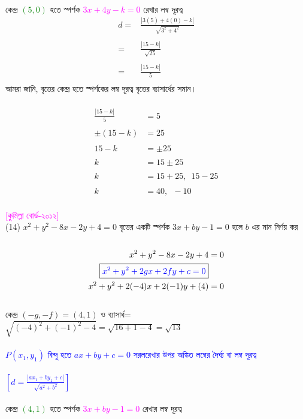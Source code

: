 \documentclass{article}
\begin{document}
	\\
	কেন্দ্র \textcolor{green}{$(5,0)$} হতে স্পর্শক \textcolor{magenta}{$3x+4y-k=0$}  রেখার লম্ব দূরত্ব \\
	\begin{align*}
		d=	&\frac{|3(5)+4(0)-k|}{\sqrt{3^2+4^2}}\\
		\\
		=	&	\frac{|15-k|}{\sqrt{25}}\\
		\\
		=	&	\frac{|15-k|}{5}\\
	\end{align*}
	আমরা জানি, বৃত্তের কেন্দ্র হতে স্পর্শকের লম্ব দূরত্ব বৃত্তের ব্যাসার্ধের সমান। \\
	\\ 
	\begin{align*}
		\frac{|15-k|}{5}&=5\\
		\\
		\pm (15-k)&=25\\
		\\
		15-k&=\pm 25\\
		\\
		k&=15\pm 25\\
		\\
		k&=15+25,\,\,\,15-25\\
		\\
		k&=40,\,\,\,-10
	\end{align*}
	\\ 
	\textcolor{magenta}{[কুমিল্লা বোর্ড-২০১২]}\\
(14)	$x^2+y^2-8x-2y+4=0$ বৃত্তের একটি স্পর্শক  $3x+by-1=0$ হলে  $b$ এর মান নির্ণয় কর\\
	\\
	\begin{align*}
		x^2+y^2-8x-2y+4&=0\\
		\boxed{\textcolor{blue}{x^2+y^2+2gx+2fy+c=0}}&\\
		x^2+y^2+2(-4)x+2(-1)y+(4)&=0
	\end{align*}
	\\
	কেন্দ্র 	$(-g,-f)=(4,1)$ ও ব্যাসার্ধ= $\sqrt{(-4)^2+(-1)^2-4}=\sqrt{16+1-4}=\sqrt{13}$\\
	\\   
	\textcolor{blue}{$P(x_1,y_1)$ বিন্দু হতে  $ax+by+c=0$ সরলরেখার উপর অঙ্কিত লম্বের দৈর্ঘ্য বা লম্ব দূরত্ব \\
		\\
		$\left[d=\frac{|ax_1+by_1+c|}{\sqrt{a^2+b^2}}\right]$}\\
	\\
	কেন্দ্র \textcolor{green}{$(4,1)$} হতে স্পর্শক \textcolor{magenta}{$3x+by-1=0$}  রেখার লম্ব দূরত্ব \\
\end{document}
